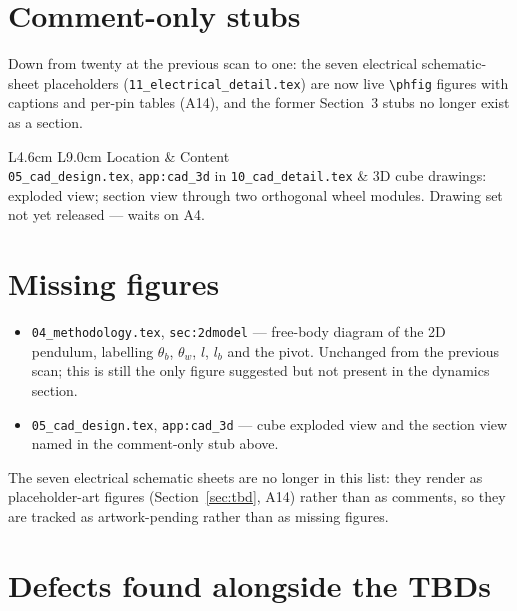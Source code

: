 \documentclass[11pt,a4paper]{article}
\begin{document}
\section{Comment-only stubs}

Down from twenty at the previous scan to one: the seven electrical
schematic-sheet placeholders (\texttt{11\_electrical\_detail.tex}) are now
live \texttt{\textbackslash phfig} figures with captions and per-pin tables
(A14), and the former Section~3 stubs no longer exist as a section.

\begin{table}[h]
\centering
\small
\begin{tabular}{L{4.6cm} L{9.0cm}}
\toprule
Location & Content \\
\midrule
\texttt{05\_cad\_design.tex}, \texttt{app:cad\_3d} in
\texttt{10\_cad\_detail.tex} & 3D cube drawings: exploded view; section view
through two orthogonal wheel modules. Drawing set not yet released --- waits
on A4. \\
\bottomrule
\end{tabular}
\end{table}

\section{Missing figures}

\begin{itemize}
  \item \texttt{04\_methodology.tex}, \texttt{sec:2dmodel} --- free-body
        diagram of the 2D pendulum, labelling $\theta_b$, $\theta_w$, $l$,
        $l_b$ and the pivot. Unchanged from the previous scan; this is still
        the only figure suggested but not present in the dynamics section.
  \item \texttt{05\_cad\_design.tex}, \texttt{app:cad\_3d} --- cube exploded
        view and the section view named in the comment-only stub above.
\end{itemize}

The seven electrical schematic sheets are no longer in this list: they render
as placeholder-art figures (Section~\ref{sec:tbd}, A14) rather than as
comments, so they are tracked as artwork-pending rather than as missing
figures.

\section{Defects found alongside the TBDs}
\end{document}
